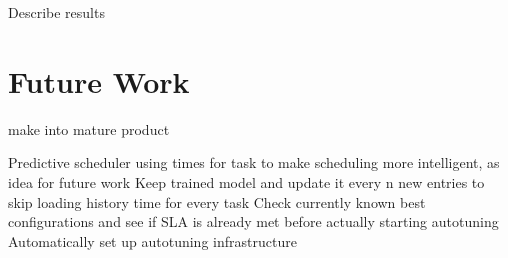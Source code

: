 Describe results

\section{Future Work}
make into mature product

Predictive scheduler using times for task to make scheduling more intelligent, as idea for future work
Keep trained model and update it every n new entries to skip loading history time for every task
Check currently known best configurations and see if SLA is already met before actually starting autotuning
Automatically set up autotuning infrastructure